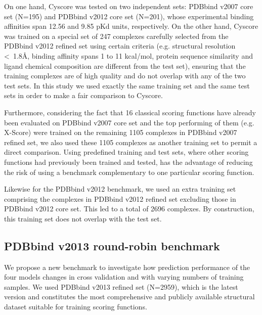 On one hand, Cyscore was tested on two independent sets: PDBbind v2007 core set (N=195) and PDBbind v2012 core set (N=201), whose experimental binding affinities span 12.56 and 9.85 pKd units, respectively. On the other hand, Cyscore was trained on a special set of 247 complexes carefully selected from the PDBbind v2012 refined set using certain criteria \citep{1372} (e.g. structural resolution \textless\ 1.8\AA, binding affinity spans 1 to 11 kcal/mol, protein sequence similarity and ligand chemical composition are different from the test set), ensuring that the training complexes are of high quality and do not overlap with any of the two test sets. In this study we used exactly the same training set and the same test sets in order to make a fair comparison to Cyscore.

Furthermore, considering the fact that 16 classical scoring functions have already been evaluated \citep{1313} on PDBbind v2007 core set and the top performing of them (e.g. X-Score) were trained on the remaining 1105 complexes in PDBbind v2007 refined set, we also used these 1105 complexes as another training set to permit a direct comparison. Using predefined training and test sets, where other scoring functions had previously been trained and tested, has the advantage of reducing the risk of using a benchmark complementary to one particular scoring function.

Likewise for the PDBbind v2012 benchmark, we used an extra training set comprising the complexes in PDBbind v2012 refined set excluding those in PDBbind v2012 core set. This led to a total of 2696 complexes. By construction, this training set does not overlap with the test set.

\subsection{PDBbind v2013 round-robin benchmark}

We propose a new benchmark to investigate how prediction performance of the four models changes in cross validation and with varying numbers of training samples. We used PDBbind v2013 refined set (N=2959), which is the latest version and constitutes the most comprehensive and publicly available structural dataset suitable for training scoring functions.

